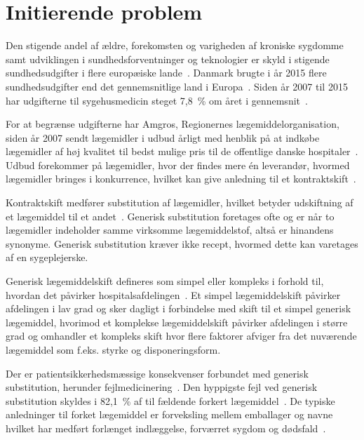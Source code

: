 \chapter{Initierende problem}
Den stigende andel af ældre, forekomsten og varigheden af kroniske sygdomme samt udviklingen i sundhedsforventninger og teknologier er skyld i stigende sundhedsudgifter i flere europæiske lande~\citep{Ess2003}. Danmark brugte i år 2015 flere sundhedsudgifter end det gennemsnitlige land i Europa~\citep{EU2017}.  Siden år 2007 til 2015 har udgifterne til sygehusmedicin steget 7,8~\% om året i gennemsnit~\citep{Sundhed2016}.

For at begrænse udgifterne har Amgros, Regionernes lægemiddelorganisation, siden år 2007 sendt lægemidler i udbud årligt med henblik på at indkøbe lægemidler af høj kvalitet til bedst mulige pris til de offentlige danske hospitaler~\citep{Sygehusapoteket2017}. Udbud forekommer på lægemidler, hvor der findes mere én leverandør, hvormed lægemidler bringes i konkurrence, hvilket kan give anledning til et kontraktskift~\citep{Amgros2015}.

Kontraktskift medfører substitution af lægemidler, hvilket betyder udskiftning af et lægemiddel til et andet~\citep{DanskSelskabforPatientsikkerhed2009}. %
Generisk substitution foretages ofte og er når to lægemidler indeholder samme virksomme lægemiddelstof, altså er hinandens synonyme. Generisk substitution kræver ikke recept, hvormed dette kan varetages af en sygeplejerske.~\citep{DanskSelskabforPatientsikkerhed2009} %

Generisk lægemiddelskift defineres som simpel eller kompleks i forhold til, hvordan det påvirker hospitalsafdelingen~\citep{Laegemiddelinformaion2017, Sygehusapoteket2017a}. Et simpel lægemiddelskift påvirker afdelingen i lav grad og sker dagligt i forbindelse med skift til et simpel generisk lægemiddel, hvorimod 
et komplekse lægemiddelskift påvirker afdelingen i større grad og omhandler et kompleks skift hvor flere faktorer afviger fra det nuværende lægemiddel som f.eks. styrke og disponeringsform.~\citep{Laegemiddelinformaion2017, Sygehusapoteket2017a}

Der er patientsikkerhedsmæssige konsekvenser forbundet med generisk substitution, herunder fejlmedicinering~\citep{Hakonsen2010}. %
Den hyppigste fejl ved generisk substitution skyldes i 82,1~\% af til fældende forkert lægemiddel~\citep{Hakonsen2010}. De typiske anledninger til forket lægemiddel er forveksling mellem emballager og navne hvilket har medført forlænget indlæggelse, forværret sygdom og dødsfald~\citep{DanskSelskabforPatientsikkerhed2009}.

